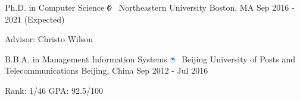 \documentclass[letterpaper]{awesome-cv}
\begin{document}
\makecvheader

\addvspace{4ex}
\begin{cventries}
  \cventry
    {Ph.D. in Computer Science}
    {\includegraphics[width=0.016\textwidth]{../images/logos/northeastern.png}~ Northeastern University}
    {Boston, MA}
    {Sep 2016 - 2021 (Expected)}
    {
      \begin{cvitems}
        \item {Advisor: Christo Wilson}
      \end{cvitems}
    }
  \cventry
    {B.B.A. in Management Information Systems}
    {\includegraphics[width=0.016\textwidth]{../images/logos/bupt.png}~ Beijing University of Posts and Telecommunications}
    {Beijing, China}
    {Sep 2012 - Jul 2016}
    {
      \begin{cvitems}
        \item {Rank: 1/46 \hspace{0.5ex} GPA: 92.5/100}
      \end{cvitems}
    }
\end{cventries}

\end{document}

